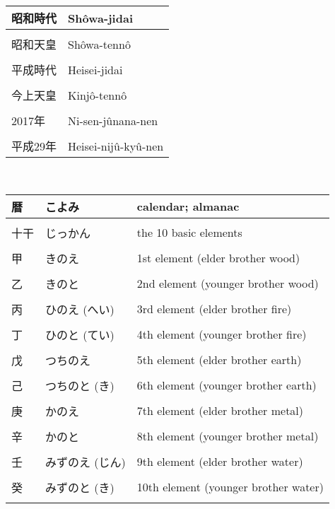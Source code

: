 \documentclass{article}
\begin{document}
\begin{tabular}{ l | p{10.5cm} }
昭和時代 						&Shôwa-jidai \\ \hline \\[-1em]
昭和天皇 						&Shôwa-tennô	 \\ \hline \\[-1em]
平成時代 						&Heisei-jidai	 \\ \hline \\[-1em]
今上天皇 						&Kinjô-tennô	\\ \hline \\[-1em]
2017年 						&Ni-sen-jûnana-nen  \\ \hline \\[-1em]
平成29年 					&Heisei-nijû-kyû-nen			 \\[-1em]
\end{tabular} \\
\begin{tabular}{ l | l | p{10.5cm} }
暦		&こよみ			&calendar; almanac \\ \hline \\[-1em]
十干		&じっかん			&the 10 basic elements \\ \hline \\[-1em]
甲		&きのえ			&1st element (elder brother wood) \\ \hline \\[-1em]
乙		&きのと			&2nd element (younger brother wood)\\ \hline \\[-1em]
丙		&ひのえ (へい)		&3rd element (elder brother fire) \\ \hline \\[-1em]
丁		&ひのと (てい)		&4th element (younger brother fire) \\ \hline \\[-1em]
戊		&つちのえ			&5th element (elder brother earth) \\ \hline \\[-1em]
己		&つちのと (き)		&6th element (younger brother earth) \\ \hline \\[-1em]
庚		&かのえ			&7th element (elder brother metal) \\ \hline \\[-1em]
辛		&かのと			&8th element (younger brother metal) \\ \hline \\[-1em]
壬		&みずのえ (じん)	&9th element (elder brother water) \\ \hline \\[-1em]
癸		&みずのと (き)		&10th element (younger brother water) \\ \hline \\[-1em]

\end{tabular}
\end{document}
